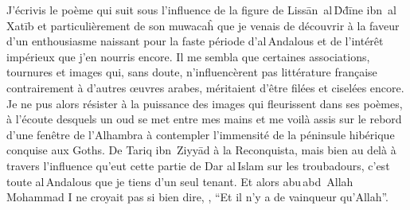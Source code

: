 \begin{prose}
  J’écrivis le poème qui suit sous l’influence de la figure de Lissān~al\,Ḋḋīne ibn~al\,Xatīb et particulièrement de son muwacaĥ  que je venais de découvrir à la faveur d’un enthousiasme naissant pour la faste période d’al\,Andalous et de l’intérêt impérieux que j’en nourris encore. Il me sembla que certaines associations, tournures et images qui, sans doute, n’influencèrent pas littérature française contrairement à d’autres œuvres arabes, méritaient d’être filées et ciselées encore. Je ne pus alors résister à la puissance des images qui fleurissent dans ses poèmes, à l’écoute desquels un oud se met entre mes mains et me voilà assis sur le rebord d’une fenêtre de l’Alhambra à contempler l’immensité de la péninsule hibérique conquise aux Goths. De Tariq ibn~Ziyyād à la Reconquista, mais bien au delà à travers l’influence qu’eut cette partie de Dar al\,Islam sur les troubadours, c’est toute al\,Andalous que je tiens d’un seul tenant. Et alors abu\,abd~Allah Mohammad {I}\ier{} ne croyait pas si bien dire, , \enquote{Et il n’y a de vainqueur qu’Allah}.

\end{prose}

